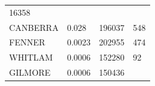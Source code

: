 \documentclass[11pt,a4paper,]{article}
\begin{document}
\begin{longtable}[]{@{}llll@{}}
\begin{minipage}[t]{0.46\columnwidth}
16358\strut
\end{minipage}\tabularnewline
\begin{minipage}[t]{0.21\columnwidth}\raggedright
CANBERRA\strut
\end{minipage} & \begin{minipage}[t]{0.10\columnwidth}\raggedright
0.028\strut
\end{minipage} & \begin{minipage}[t]{0.11\columnwidth}\raggedright
196037\strut
\end{minipage} & \begin{minipage}[t]{0.46\columnwidth}\raggedright
548\strut
\end{minipage}\tabularnewline
\begin{minipage}[t]{0.21\columnwidth}\raggedright
FENNER\strut
\end{minipage} & \begin{minipage}[t]{0.10\columnwidth}\raggedright
0.0023\strut
\end{minipage} & \begin{minipage}[t]{0.11\columnwidth}\raggedright
202955\strut
\end{minipage} & \begin{minipage}[t]{0.46\columnwidth}\raggedright
474\strut
\end{minipage}\tabularnewline
\begin{minipage}[t]{0.21\columnwidth}\raggedright
WHITLAM\strut
\end{minipage} & \begin{minipage}[t]{0.10\columnwidth}\raggedright
0.0006\strut
\end{minipage} & \begin{minipage}[t]{0.11\columnwidth}\raggedright
152280\strut
\end{minipage} & \begin{minipage}[t]{0.46\columnwidth}\raggedright
92\strut
\end{minipage}\tabularnewline
\begin{minipage}[t]{0.21\columnwidth}\raggedright
GILMORE\strut
\end{minipage} & \begin{minipage}[t]{0.10\columnwidth}\raggedright
0.0006\strut
\end{minipage} & \begin{minipage}[t]{0.11\columnwidth}\raggedright
150436\strut
\end{minipage} & \begin{minipage}[t]{0.46\columnwidth}\raggedright

\end{minipage}
\end{longtable}
\end{document}

